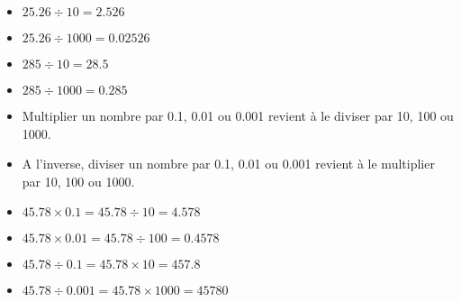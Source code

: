 	\begin{myexs}
		\begin{multicols}{2}
			\begin{itemize}
				\item $\num{25.26} \div 10 = \num{2.526}$ 
				\item $\num{25.26} \div 1000 = \num{0.02526} $
				\item $\num{285} \div 10 = \num{28.5} $ 
				\item $\num{285} \div 1000 = \num{0.285}$ 
			\end{itemize}	
		\end{multicols}
		
	\end{myexs}

	\begin{myprops}
		\begin{itemize}
			\item Multiplier un nombre par \num{0.1}, \num{0.01} ou \num{0.001} revient à le diviser par 10, 100 ou 1000.
			
			\item A l'inverse, diviser un nombre par \num{0.1}, \num{0.01} ou \num{0.001} revient à le multiplier par 10, 100 ou 1000.
		\end{itemize}
	\end{myprops}

	\begin{myexs}
			\begin{itemize}
				\item $\num{45.78} \times \num{0.1} = \num{45.78} \div \num{10} = \num{4.578}$ 
				\item $\num{45.78} \times \num{0.01} = \num{45.78} \div \num{100} = \num{0.4578}$ 
				\item $\num{45.78} \div \num{0.1} = \num{45.78} \times \num{10} = \num{457.8}$ 
				\item $\num{45.78} \div \num{0.001} = \num{45.78} \times \num{1000} = \num{45780}$ 
			\end{itemize}	
		
	\end{myexs}
%
%			


